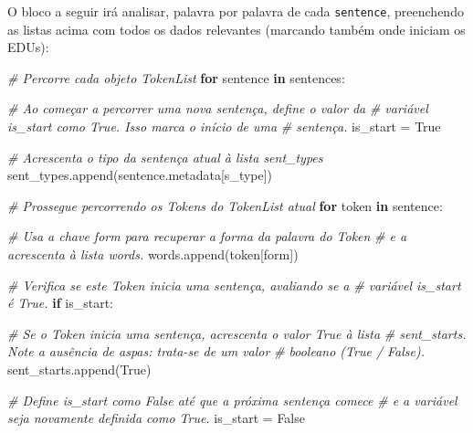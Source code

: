 \documentclass[
  brazilian,
]{article}
\newenvironment{Shaded}{}{}
\newcommand{\CommentTok}[1]{\textcolor[rgb]{0.38,0.63,0.69}{\textit{#1}}}
\newcommand{\ControlFlowTok}[1]{\textcolor[rgb]{0.00,0.44,0.13}{\textbf{#1}}}
\newcommand{\KeywordTok}[1]{\textcolor[rgb]{0.00,0.44,0.13}{\textbf{#1}}}
\newcommand{\NormalTok}[1]{#1}
\newcommand{\OperatorTok}[1]{\textcolor[rgb]{0.40,0.40,0.40}{#1}}
\newcommand{\StringTok}[1]{\textcolor[rgb]{0.25,0.44,0.63}{#1}}
\newcommand{\VariableTok}[1]{\textcolor[rgb]{0.10,0.09,0.49}{#1}}
\begin{document}
O bloco a seguir irá analisar, palavra por palavra de cada
\texttt{sentence}, preenchendo as listas acima com todos os dados
relevantes (marcando também onde iniciam os EDUs):

\begin{Shaded}
\begin{Highlighting}[]
\CommentTok{\# Percorre cada objeto TokenList}
\ControlFlowTok{for}\NormalTok{ sentence }\KeywordTok{in}\NormalTok{ sentences:}
    
    \CommentTok{\# Ao começar a percorrer uma nova sentença, define o valor da}
    \CommentTok{\# variável \textquotesingle{}is\_start\textquotesingle{} como True. Isso marca o início de uma}
    \CommentTok{\# sentença.}
\NormalTok{    is\_start }\OperatorTok{=} \VariableTok{True}
    
    \CommentTok{\# Acrescenta o tipo da sentença atual à lista \textquotesingle{}sent\_types\textquotesingle{}}
\NormalTok{    sent\_types.append(sentence.metadata[}\StringTok{\textquotesingle{}s\_type\textquotesingle{}}\NormalTok{])}
        
    \CommentTok{\# Prossegue percorrendo os Tokens do TokenList atual}
    \ControlFlowTok{for}\NormalTok{ token }\KeywordTok{in}\NormalTok{ sentence:}
        
        \CommentTok{\# Usa a chave \textquotesingle{}form\textquotesingle{} para recuperar a forma da palavra do Token}
        \CommentTok{\# e a acrescenta à lista \textquotesingle{}words\textquotesingle{}.}
\NormalTok{        words.append(token[}\StringTok{\textquotesingle{}form\textquotesingle{}}\NormalTok{])}
        
        \CommentTok{\# Verifica se este Token inicia uma sentença, avaliando se a}
        \CommentTok{\# variável \textquotesingle{}is\_start\textquotesingle{} é True.}
        \ControlFlowTok{if}\NormalTok{ is\_start:}
            
            \CommentTok{\# Se o Token inicia uma sentença, acrescenta o valor True à lista}
            \CommentTok{\# \textquotesingle{}sent\_starts\textquotesingle{}. Note a ausência de aspas: trata{-}se de um valor}
            \CommentTok{\# booleano (True / False).}
\NormalTok{            sent\_starts.append(}\VariableTok{True}\NormalTok{)}
            
            \CommentTok{\# Define \textquotesingle{}is\_start\textquotesingle{} como False até que a próxima sentença comece}
            \CommentTok{\# e a variável seja novamente definida como True.}
\NormalTok{            is\_start }\OperatorTok{=} \VariableTok{False}
        

\end{Highlighting}
\end{Shaded}
\end{document}
